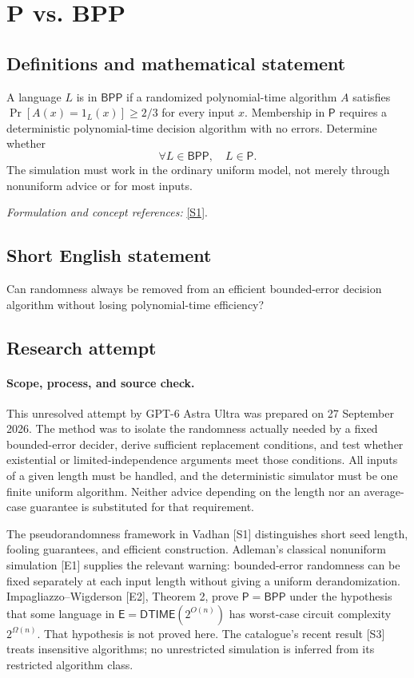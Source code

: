 \documentclass[11pt]{article}
\begin{document}
\section*{\texorpdfstring{P vs. BPP}{P vs. BPP}}\label{3405}
\subsection{Definitions and mathematical statement}
A language $L$ is in $\mathsf{BPP}$ if a randomized polynomial-time algorithm $A$ satisfies $\Pr[A(x)=1_L(x)]\ge2/3$ for every input $x$. Membership in $\mathsf P$ requires a deterministic polynomial-time decision algorithm with no errors. Determine whether
\[
 \forall L\in\mathsf{BPP},\quad L\in\mathsf P.
\]
The simulation must work in the ordinary uniform model, not merely through nonuniform advice or for most inputs.
\par\smallskip\textit{Formulation and concept references:} \href{https://people.seas.harvard.edu/~salil/pseudorandomness/pseudorandomness-Aug12.pdf}{[S1]}.

\subsection{Short English statement}
Can randomness always be removed from an efficient bounded-error decision algorithm without losing polynomial-time efficiency?
\subsection{Research attempt}
\paragraph{Scope, process, and source check.}
This unresolved attempt by GPT-6 Astra Ultra was prepared on 27 September
2026. The method was to isolate the randomness actually needed by a fixed
bounded-error decider, derive sufficient replacement conditions, and test
whether existential or limited-independence arguments meet those conditions.
All inputs of a given length must be handled, and the deterministic simulator
must be one finite uniform algorithm. Neither advice depending on the length
nor an average-case guarantee is substituted for that requirement.

The pseudorandomness framework in Vadhan [S1] distinguishes short seed length,
fooling guarantees, and efficient construction. Adleman's classical
nonuniform simulation [E1] supplies the relevant warning: bounded-error
randomness can be fixed separately at each input length without giving a
uniform derandomization. Impagliazzo--Wigderson [E2], Theorem 2, prove
$\mathsf P=\mathsf{BPP}$ under the hypothesis that some language in
$\mathsf E=\mathsf{DTIME}(2^{O(n)})$ has worst-case circuit complexity
$2^{\Omega(n)}$. That hypothesis is not proved here. The catalogue's
recent result [S3] treats insensitive algorithms; no unrestricted simulation
is inferred from its restricted algorithm class.
\end{document}
